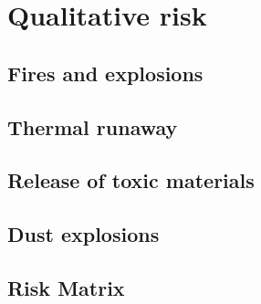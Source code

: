 \section{Qualitative risk}
\subsection{Fires and explosions}
\subsection{Thermal runaway}
\subsection{Release of toxic materials}
\subsection{Dust explosions}
\subsection{Risk Matrix}